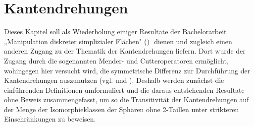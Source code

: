 \documentclass[12pt,titlepage,twoside,cleardoublepage]{article}
\theoremstyle{nummermitklammern}
\numberwithin{equation}{section}
\begin{document}
 \section{Kantendrehungen}\label{edget}
Dieses Kapitel soll als Wiederholung einiger Resultate der Bachelorarbeit „Manipulation diskreter simplizialer Flächen" (\cite{Rey})
$ $ dienen und zugleich einen anderen Zugang zu der Thematik der Kantendrehungen liefern. Dort wurde der Zugang durch die sogenannten Mender- und Cutteroperatoren ermöglicht, wohingegen hier versucht wird, die symmetrische Differenz zur Durchführung der Kantendrehungen auszunutzen (vgl. \cite{Rey} und \cite{simp}). Deshalb werden zunächst die einführenden Definitionen umformuliert und die daraus entstehenden Resultate ohne Beweis zusammengefasst, um so die Transitivität der Kantendrehungen auf der Menge der Isomorphieklassen der Sphären ohne 2-Taillen unter strikteren Einschränkungen zu beweisen. 
\end{document}

